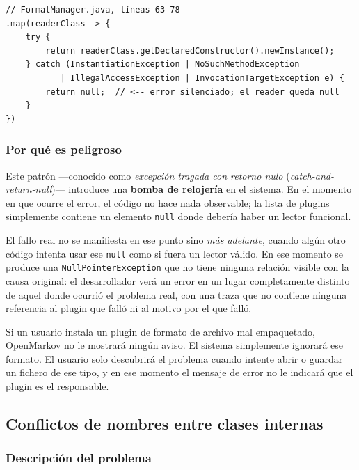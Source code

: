 \documentclass[11pt,a4paper]{article}
\begin{document}
\begin{lstlisting}[caption={Antipatrón en \texttt{FormatManager.java} — error silenciado},label={lst:formatmanager}]
// FormatManager.java, líneas 63-78
.map(readerClass -> {
    try {
        return readerClass.getDeclaredConstructor().newInstance();
    } catch (InstantiationException | NoSuchMethodException
           | IllegalAccessException | InvocationTargetException e) {
        return null;  // <-- error silenciado; el reader queda null
    }
})
\end{lstlisting}

\subsubsection{Por qué es peligroso}

Este patrón —conocido como \textit{excepción tragada con retorno nulo} (\textit{catch-and-return-null})—
introduce una \textbf{bomba de relojería} en el sistema. En el momento en que ocurre el error, el
código no hace nada observable; la lista de plugins simplemente contiene un elemento \texttt{null}
donde debería haber un lector funcional.

El fallo real no se manifiesta en ese punto sino \emph{más adelante}, cuando algún otro código
intenta usar ese \texttt{null} como si fuera un lector válido. En ese momento se produce una
\texttt{NullPointerException} que no tiene ninguna relación visible con la causa original: el
desarrollador verá un error en un lugar completamente distinto de aquel donde ocurrió el
problema real, con una traza que no contiene ninguna referencia al plugin que falló ni al motivo
por el que falló.

\begin{consecuenciabox}
    Si un usuario instala un plugin de formato de archivo mal empaquetado, OpenMarkov no le
    mostrará ningún aviso. El sistema simplemente ignorará ese formato. El usuario solo
    descubrirá el problema cuando intente abrir o guardar un fichero de ese tipo, y en ese
    momento el mensaje de error no le indicará que el plugin es el responsable.
\end{consecuenciabox}

\subsection{Conflictos de nombres entre clases internas}

\subsubsection{Descripción del problema}
\end{document}
